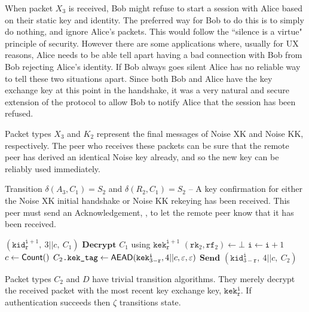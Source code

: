 \documentclass{article}
\begin{document}
When packet $X_3$ is received, Bob might refuse to start a session with Alice based on their static key and identity. The preferred way for Bob to do this is to simply do nothing, and ignore Alice's packets. This would follow the ``silence is a virtue" principle of security. However there are some applications where, usually for UX reasons, Alice needs to be able tell apart having a bad connection with Bob from Bob rejecting Alice's identity. If Bob always goes silent Alice has no reliable way to tell these two situations apart. Since both Bob and Alice have the key exchange key at this point in the handshake, it was a very natural and secure extension of the protocol to allow Bob to notify Alice that the session has been refused.

Packet types $X_3$ and $K_2$ represent the final messages of Noise XK and Noise KK, respectively. The peer who receives these packets can be sure that the remote peer has derived an identical Noise key already, and so the new key can be reliably used immediately.

\begin{algorithm}
	\caption{Transition $\delta(A_3, C_1)=S_2$ and $\delta(R_2, C_1)=S_2$ -- A key confirmation for either the Noise XK initial handshake or Noise KK rekeying has been received. This peer must send an Acknowledgement, , to let the remote peer know that it has been received.}\label{alg:key_conf}
	\begin{algorithmic}
		\Require $(\texttt{kid}^{\texttt{i} + 1}_{\texttt{r}},\ 3||c,\ C_1)$
		\State $\textbf{Decrypt } C_1$ using $\texttt{kek}^{\texttt{i} + 1}_{\texttt{r}}$
		\State $(\texttt{rk}_2, \texttt{rf}_2) \gets \bot$
		\State $\texttt{i} \gets \texttt{i} + 1$
		\State $c \gets \text{\sf Count}()$
		\State $C_2\texttt{.kek\_tag} \gets \text{\sf AEAD}(\texttt{kek}^\texttt{i}_{3 - \texttt{r}}, 4||c, \varepsilon, \varepsilon)$
		\State $\textbf{Send } (\texttt{kid}^\texttt{i}_{3 - \texttt{r}},\ 4||c,\ C_2)$
	\end{algorithmic}
\end{algorithm}

Packet types $C_2$ and $D$ have trivial transition algorithms. They merely decrypt the received packet with the most recent key exchange key, $\texttt{kek}^\texttt{i}_\texttt{r}$. If authentication succeeds then $\zeta$ transitions state.
\end{document}
